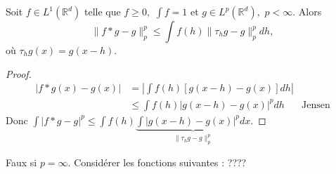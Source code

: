\begin{propriete}
    Soit $f\in L^1(\mathbb{R} ^d)$ telle que $f\ge 0,$ $\int f=1$ et $g\in L^p(\mathbb{R} ^d),$ $p<\infty .$ Alors
    $$\|f*g-g\|^p_p\le \int f(h)\|\tau_h g-g\|_p^pdh,$$
    où $\tau_h g(x)=g(x-h).$
\end{propriete}
\begin{proof}
    \begin{align*}
        |f*g(x)-g(x)| &=|\int f(h) \left[ g(x-h)-g(x) \right] dh|\\
                      &\le \int f(h)|g(x-h)-g(x)|^pdh &\text{Jensen}
    \end{align*}
    Donc $\int |f*g-g| ^p\le \int f(h)\underbrace{\int |g(x-h)-g(x)|^pdx}_{\|\tau_hg-g\|_p^p}.$
\end{proof}
\begin{remarque}
    Faux si $p=\infty .$ Considérer les fonctions suivantes : ????
\end{remarque}

